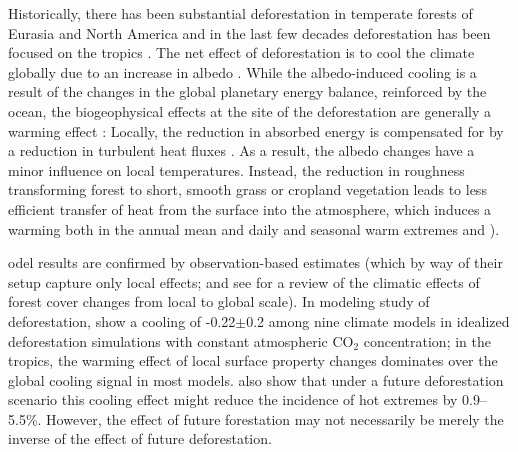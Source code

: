 \documentclass[draft]{agujournal2019}
\begin{document}
Historically, there has been substantial deforestation in temperate forests of Eurasia and North America and in the last few decades deforestation has been focused on the tropics \cite{goldewijk_estimating_2001}.
The net effect of deforestation is to cool the climate globally due to an increase in albedo \cite{davin_climatic_2010}.
While the albedo-induced cooling is a result of the changes in the global planetary energy balance, reinforced by the ocean, the biogeophysical effects at the site of the deforestation are generally a warming effect \cite{winckler_nonlocal_2019}: Locally, the reduction in absorbed energy is compensated for by a reduction in turbulent heat fluxes \cite{winckler_importance_2019}.
As a result, the albedo changes have a minor influence on local temperatures.
Instead, the reduction in roughness transforming forest to short, smooth grass or cropland vegetation leads to less efficient transfer of heat from the surface into the atmosphere, which induces a warming both in the annual mean and daily and seasonal warm extremes \cite{winckler_different_2019}
  and ).

odel results are confirmed by observation-based estimates (which by way of their setup capture only local effects;  and see  for a review of the climatic effects of forest cover changes from local to global scale).
In  modeling study of deforestation,  show a cooling of -0.22$\pm$0.2 \textcelsius{} among nine climate models in idealized deforestation simulations with constant atmospheric CO$_2$ concentration; in the tropics, the warming effect of local surface property changes dominates over the global cooling signal in most models.
 also show that under a future deforestation scenario this cooling effect might reduce the incidence of hot extremes by 0.9--5.5\%.
However, the effect of future forestation may not necessarily be merely the inverse of the effect of future deforestation.
\end{document}
